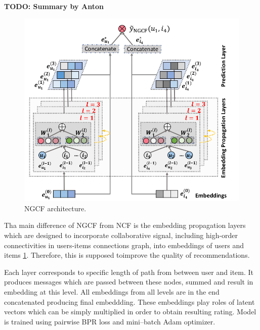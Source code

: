 \textbf{TODO: Summary by Anton}
\begin{figure}[h]
    \centering
    \includegraphics[width=0.8\linewidth]{images/ngcf.png}
    \caption{NGCF architecture.}
    \label{fig:ngcf}
\end{figure}

Tha main difference of NGCF \cite{wang2019neural} from NCF is the embedding propagation layers which are 
designed to incorporate collaborative signal, including high-order connectivities 
in users-items connections graph, into embeddings of users and items \ref{fig:ngcf}.
Therefore, this is supposed toimprove the quality of recommendations. 

Each layer corresponds to specific length of path from between user and item.
It produces messages which are passed between these nodes, summed and result in
embedding at this level. All embeddings from all levels are in the end concatenated
producing final embeddding.
These embeddings play roles of latent vectors which can be simply multiplied 
in order to obtain resulting rating.
Model is trained using pairwise BPR loss and mini--batch Adam optimizer.